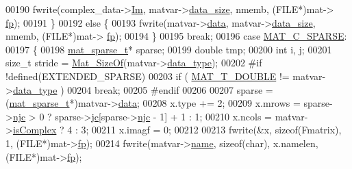 \begin{DoxyCode}
{00190                 fwrite(complex\_data->\hyperlink{group___m_a_t_a7182d10b0d3598415887376065440946}{Im}, matvar->\hyperlink{group___m_a_t_a9ad1c82e2b568da617e12dc73a26e1f9}{data\_size}, nmemb, (FILE*)mat->
      \hyperlink{struct__mat__t_a85f562e407ca9ad4d2a6e14f839432b7}{fp});
00191             \}
00192             \textcolor{keywordflow}{else} \{
00193                 fwrite(matvar->\hyperlink{group___m_a_t_a5672978efa230bbdecdf38ede781f7fa}{data}, matvar->\hyperlink{group___m_a_t_a9ad1c82e2b568da617e12dc73a26e1f9}{data\_size}, nmemb, (FILE*)mat->
      \hyperlink{struct__mat__t_a85f562e407ca9ad4d2a6e14f839432b7}{fp});
00194             \}
00195             \textcolor{keywordflow}{break};
00196         \textcolor{keywordflow}{case} \hyperlink{group___m_a_t_ggad4d60ae7b709fc81bfd744fb4c857c40a0d5655b7e6178a2242cb3bb56ff4c8d2}{MAT\_C\_SPARSE}:
00197         \{
00198             \hyperlink{group___m_a_t_structmat__sparse__t}{mat\_sparse\_t}* sparse;
00199             \textcolor{keywordtype}{double} tmp;
00200             \textcolor{keywordtype}{int} i, j;
00201             \textcolor{keywordtype}{size\_t} stride = \hyperlink{group__mat__util_gab6774aabdc124c540c1e7686d0804940}{Mat\_SizeOf}(matvar->\hyperlink{group___m_a_t_ab6aafe9bd77f0f077852593dec438144}{data\_type});
00202 \textcolor{preprocessor}{#if !defined(EXTENDED\_SPARSE)}
00203             \textcolor{keywordflow}{if} ( \hyperlink{group___m_a_t_ggacf7b3b879282b7ab3a51190e49bf3453a31e721ecf7e188196f83c32838288797}{MAT\_T\_DOUBLE} != matvar->\hyperlink{group___m_a_t_ab6aafe9bd77f0f077852593dec438144}{data\_type} )
00204                 \textcolor{keywordflow}{break};
00205 \textcolor{preprocessor}{#endif}
00206 
00207             sparse = (\hyperlink{group___m_a_t_structmat__sparse__t}{mat\_sparse\_t}*)matvar->\hyperlink{group___m_a_t_a5672978efa230bbdecdf38ede781f7fa}{data};
00208             x.type += 2;
00209             x.mrows = sparse->\hyperlink{group___m_a_t_a482d8e4b40aa975f0c1daf146ebe08a4}{njc} > 0 ? sparse->\hyperlink{group___m_a_t_ad1e74cdc4f7eff1e47a670297c01da4b}{jc}[sparse->\hyperlink{group___m_a_t_a482d8e4b40aa975f0c1daf146ebe08a4}{njc} - 1] + 1 : 1;
00210             x.ncols = matvar->\hyperlink{group___m_a_t_aeb03b3a69f108dc05470b00443a43739}{isComplex} ? 4 : 3;
00211             x.imagf = 0;
00212 
00213             fwrite(&x, \textcolor{keyword}{sizeof}(Fmatrix), 1, (FILE*)mat->\hyperlink{struct__mat__t_a85f562e407ca9ad4d2a6e14f839432b7}{fp});
00214             fwrite(matvar->\hyperlink{group___m_a_t_a5d4b55b041e3b4fb50c04337f05ad909}{name}, \textcolor{keyword}{sizeof}(\textcolor{keywordtype}{char}), x.namelen, (FILE*)mat->\hyperlink{struct__mat__t_a85f562e407ca9ad4d2a6e14f839432b7}{fp});
}
\end{DoxyCode}

